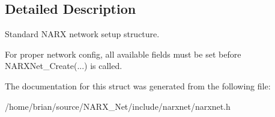 \subsection{Detailed Description}
Standard N\-A\-R\-X network setup structure. 

For proper network config, all available fields must be set before N\-A\-R\-X\-Net\-\_\-\-Create(...) is called. 

The documentation for this struct was generated from the following file\-:\begin{DoxyCompactItemize}
\item 
/home/brian/source/\-N\-A\-R\-X\-\_\-\-Net/include/narxnet/narxnet.\-h\end{DoxyCompactItemize}
